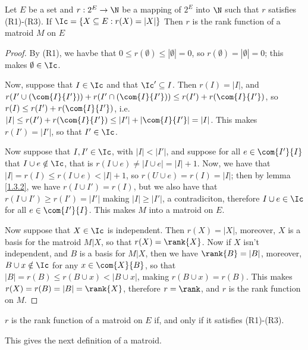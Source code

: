 \begin{theorem}\label{1.3.3}
    Let $E$ be a set and $r:2^E \rightarrow \N$ be a mapping of $2^E$ into
    $\N$ such that $r$ satisfies (R1)-(R3). If $\Ic=\{X \subseteq E :
    r(X)=|X|\}$ Then $r$ is the rank function of a matroid $M$ on $E$
\end{theorem}
\begin{proof}
    By (R1), we havbe that $0 \leq r(\emptyset) \leq |\emptyset|=0$, so
    $r(\emptyset)=|\emptyset|=0$; this makes $\emptyset \in \Ic$.

    Now, suppose that $I \in \Ic$ and that  $\Ic' \subseteq I$. Then
    $r(I)=|I|$, and $r(I' \cup (\com{I}{I'}))+r(I' \cap (\com{I}{I'})) \leq
    r(I')+r(\com{I}{I'})$, so $r(I) \leq r(I')+r(\com{I}{I'})$, i.e. $|I| \leq
    r(I')+r(\com{I}{I'}) \leq |I'|+|\com{I}{I'}|=|I|$. This makes $r(I')=|I'|$,
    so that $I' \in \Ic$.

    Now suppose that $I,I' \in \Ic$, with  $|I|<|I'|$, and suppose for all $e
    \in \com{I'}{I}$ that $I \cup e \notin \Ic$, that is  $r(I \cup e) \neq |I
    \cup e|=|I|+1$. Now, we have that $|I|=r(I) \leq r(I \cup e)<|I|+1$, so $r(U
    \cup e)=r(I)=|I|$; then by lemma \ref{1.3.2}, we have $r(I \cup I')=r(I)$,
    but we also have that $r(I \cup I') \geq r(I')=|I'|$ making $|I| \geq |I'|$,
    a contradiciton, therefore  $I \cup e \in \Ic$ for all  $e \in \com{I'}{I}$.
    This makes $M$ into a matroid on $E$.

    Now suppose that $X \in \Ic$ is independent. Then  $r(X)=|X|$, moreover, $X$
    is a basis for the matroid  $M|X$, so that  $r(X)=\rank{X}$. Now if $X$
    isn't independent, and  $B$ is a basis for  $M|X$, then we have
    $\rank{B}=|B|$, moreover, $B \cup x \notin \Ic$ for any  $x \in \com{X}{B}$,
    so that $|B|=r(B) \leq r(B \cup x)<|B \cup x|$, making $r(B \cup x)=r(B)$.
    This makes $r(X)=r(B)=|B|=\rank{X}$, therefore $r=\rank$, and  $r$ is the
    rank function on  $M$.
\end{proof}
\begin{corollary}
    $r$ is the rank function of a matroid on  $E$ if, and only if it satisfies
    (R1)-(R3).
\end{corollary}

This gives the next definition of a matroid.

